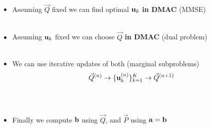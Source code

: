 \documentclass[xcolor=dvipsnames,aspectratio=169]{beamer}
\begin{document}
{\begin{itemize}
 \begin{theorem} The same SINRs can be achieved with the same \textbf{sum of} power
 \begin{equation}
 \begin{split}
 \gamma_k=\gamma_k^{DMAC} \Rightarrow \ab=\bb \Rightarrow
  \sum_{k=1}^{K}P_k&=N_o\one_{K}^T(\Delb_{\ab}^{-1}- \Gb)^{-1}\one_{K}\\
    &=N_o\one_{K}^T(\Delb_{\bb}^{-1}- \Gb^T)^{-1}\one_{K}\\
    &=\sum_{k=1}^{K}Q_k
  \end{split}
 \end{equation}
 \end{theorem}
 \pagebreak
    \item Assuming $\vec{Q}$ fixed we can find optimal $\mathbf{u}_k$ \textbf{in DMAC} (MMSE)\\ \ \\
    \item Assuming $\mathbf{u}_k$ fixed we can choose $\vec{Q}$ \textbf{in DMAC} (dual problem)\\ \ \\
    \item We can use iterative updates of both (marginal subproblems)
    $$\vec{Q}^{(n)}\to\{\mathbf{u}_k^{(n)}\}_{k=1}^{K}\to \vec{Q}^{(n+1)}$$\\ \ \\
    \item Finally we compute $\mathbf{b}$ using $\vec{Q}$, and $\vec{P}$ using $\mathbf{a}=\mathbf{b}$\\ \ \\
\end{itemize}
}


\end{document}
